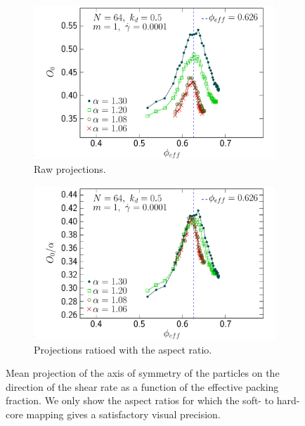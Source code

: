 \documentclass[class=report, float=false, crop=false]{standalone}
\begin{document}
\begin{figure}[h!]
\centering
    \begin{subfigure}[t]{0.49\textwidth}
        \centering
        \includegraphics[width=\textwidth]{figures/figs/ori0_phieff_0064_KDk500_Ml100_GDh100}
        \caption{Raw projections.}
        \label{ori0_phieff_prolate_0064_KDk500_Ml100_GDh100}
    \end{subfigure}
    \hfill
    \begin{subfigure}[t]{0.49\textwidth}
        \centering
        \includegraphics[width=\textwidth]{figures/figs/ori0al_phieff_0064_KDk500_Ml100_GDh100}
        \caption{Projections ratioed with the aspect ratio.}
        \label{ori0al_phieff_prolate_0064_KDk500_Ml100_GDh100}
    \end{subfigure}
    \caption{Mean projection of the axis of symmetry of the particles on the direction of the shear rate as a function of the effective packing fraction. We only show the aspect ratios for which the soft- to hard-core mapping gives a satisfactory visual precision.}
    \label{ori_phieff_0064}
\end{figure}
\end{document}
